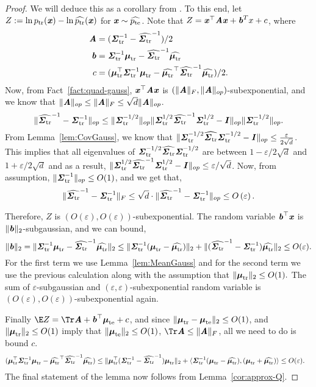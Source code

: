 \begin{proof}
    We will deduce this as a corollary from . To this end, let $Z := \ln \ptr(\xx) - \ln \widehat{\ptr}(\xx)$ for $\xx\sim \widehat{\pte}$. Note that $Z = \xx^{\top} \AA \xx + \bb^T x + c$, where 
    \begin{align*}
        \AA & = (\str^{-1} - \widehat{\str}^{-1})/2 \\
        \bb & =\str^{-1} \mtr - \widehat{\str}^{-1} \widehat{\mtr} \\
        c & = (\mtr^{\top} \str^{-1} \mtr - \widehat{\mtr}^{\top} \widehat{\str}^{-1} \widehat{\mtr})/2.
    \end{align*}
 Now, from Fact~\ref{fact:quad-gauss}, $\xx^{\top} \AA \xx$ is $(\|\AA\|_F, \|\AA\|_{op})$-subexponential, and we know that $\|\AA\|_{op} \leq \|\AA\|_F\leq \sqrt{d}\|\AA\|_{op}$. 
  \[
    \|\widehat{\str}^{-1}-\str^{-1}\|_{op} \leq \|\str^{-1/2}\|_{op}\|\str^{1/2}\widehat{\str}^{-1}\str^{1/2}-\II\|_{op}\|\str^{-1/2}\|_{op}.
    \]
    From Lemma~\ref{lem:CovGauss}, we know that $\|\str^{-1/2}\widehat{\str}\str^{-1/2}-\II\|_{op} \leq \frac{\varepsilon}{2\sqrt{d}}$. This implies that all eigenvalues of $\str^{-1/2}\widehat{\str}\str^{-1/2}$ are between $1-\varepsilon/2\sqrt{d}$ and $1+\varepsilon/2\sqrt{d}$ and as a result, $\|\str^{1/2}\widehat{\str}^{-1}\str^{1/2}-\II\|_{op} \leq \varepsilon/\sqrt{d}$. Now, from assumption, $\|\str^{-1}\|_{op} \leq O(1)$, and we get that,
    \[
    \|\widehat{\str}^{-1}-\str^{-1}\|_{F}\leq \sqrt{d} \cdot \|\widehat{\str}^{-1}-\str^{-1}\|_{op}\leq O\left(\varepsilon\right).
    \]

 Therefore, $Z$ is $(O(\varepsilon), O(\varepsilon))$-subexponential. The random variable $\bb^{\top} \xx$ is $\|\bb\|_2$-subgaussian, and we can bound,
    \begin{equation*}
        \|\bb\|_2 = \|\str^{-1} \mtr - \widehat{\str}^{-1} \widehat{\mtr}\|_2 \leq \|\str^{-1}(\mtr-\widehat{\mtr})\|_2  +  \|(\widehat{\str}^{-1}-\str^{-1})\widehat{\mtr}\|_2  \leq O(\varepsilon).
    \end{equation*}
For the first term we use Lemma~\ref{lem:MeanGauss} and for the second term we use the previous calculation along with the assumption that $\|\mtr\|_2\leq O(1).$
    The sum of $\varepsilon$-subgaussian and $(\varepsilon, \varepsilon)$-subexponential random variable is $(O(\varepsilon), O(\varepsilon))$-subexponential again.

    Finally $\E Z = \Tr \AA + \bb^{\top}\mte + c$, and since $\|\mtr-\mte\|_2\leq O(1)$, and $\|\mtr\|_2\leq O(1)$ imply that $\|\mte\|_2\leq O(1)$, $\Tr \AA \leq \|\AA\|_F$, all we need to do is bound $c$.
    \begin{align*}
        (\mtr^{\top} \str^{-1} \mtr - \widehat{\mtr}^{\top} \widehat{\str}^{-1} \widehat{\mtr}) & \leq
        \|\mtr^{\top} (\str^{-1} - \widehat{\str}^{-1}) \mtr\|_2 + \langle \str^{-1}(\mtr - \widehat{\mtr}), (\mtr+ \widehat{\mtr}) \rangle \leq O(\varepsilon) .
    \end{align*}
    The final statement of the lemma now follows from Lemma~\ref{cor:approx-Q}.
\end{proof}

